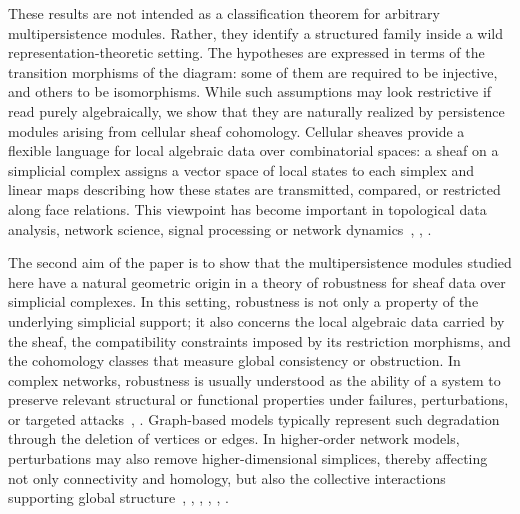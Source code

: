 \documentclass[reqno,12pt]{amsart}
\newcommand{\0}{\mathbf 0}
\theoremstyle{definition}
\begin{document}
These results are not intended as a classification theorem for arbitrary multipersistence modules. Rather, they identify a structured family inside a wild representation-theoretic setting. The hypotheses are expressed in terms of the transition morphisms of the diagram: some of them are required to be injective, and others to be isomorphisms. While such assumptions may look restrictive if read purely algebraically, we show that they are naturally realized by persistence modules arising from cellular sheaf cohomology. Cellular sheaves provide a flexible language for local algebraic data over combinatorial spaces: a sheaf on a simplicial complex assigns a vector space of local states to each simplex and linear maps describing how these states are transmitted, compared, or restricted along face relations. This viewpoint has become important in topological data analysis, network science, signal processing or network dynamics~\cite{Curry14}, \cite{Hansen20,Ghrist_Hansen19,Ghrist_Hansen21}, \cite{Shepard85}. 

The second aim of the paper is to show that the multipersistence modules studied here have a natural geometric origin in a theory of robustness for sheaf data over simplicial complexes. In this setting, robustness is not only a property of the underlying simplicial support; it also concerns the local algebraic data carried by the sheaf, the compatibility constraints imposed by its restriction morphisms, and the cohomology classes that measure global consistency or obstruction. In complex networks, robustness is usually understood as the ability of a system to preserve relevant structural or functional properties under failures, perturbations, or targeted attacks~\cite{Artime_Otros2024}, \cite{Barabasi_Posfai16}. Graph-based models typically represent such degradation through the deletion of vertices or edges. In higher-order network models, perturbations may also remove higher-dimensional simplices, thereby affecting not only connectivity and homology, but also the collective interactions supporting global structure~\cite{Bianconi_Ziff18}, \cite{Bobrowski_Skraba20}, \cite{Bobrowski_Skraba22}, \cite{Chen_Otros23}, \cite{Zhao_otros22_2}, \cite{Zhao_Otros22}. 
\end{document}
